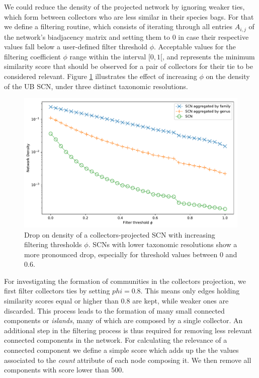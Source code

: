 We could reduce the density of the projected network by ignoring weaker ties, which form between collectors who are less similar in their species bags.
For that we define a filtering routine, which consists of iterating through all entries $A_{i,j}$ of the network's biadjacency matrix and setting them to $0$ in case their respective values fall below a user-defined filter threshold $\phi$.
Acceptable values for the filtering coefficient $\phi$ range within the interval $[0,1[$, and represents the minimum similarity score that should be observed for a pair of collectors for their tie to be considered relevant.
Figure \ref{fig:ub_scn_projCol_filter_thresh} illustrates the effect of increasing $\phi$ on the density of the UB SCN, under three distinct taxonomic resolutions. 

\begin{figure}[!ht]
  	\centering
    \includegraphics[width=0.9\linewidth]{figures/casestudy_ub/scn_projCol_filter_thresh.pdf}
    \caption{ Drop on density of a collectors-projected SCN with increasing filtering thresholds $\phi$. SCNs with lower taxonomic resolutions show a more pronounced drop, especially for threshold values between $0$ and $0.6$. }
    \label{fig:ub_scn_projCol_filter_thresh}
\end{figure}

For investigating the formation of communities in the collectors projection, we first filter collectors ties by setting $phi = 0.8$.
This means only edges holding similarity scores equal or higher than $0.8$ are kept, while weaker ones are discarded.
This process leads to the formation of many small connected components or \textit{islands}, many of which are composed by a single collector.
An additional step in the filtering process is thus required for removing less relevant connected components in the network.
For calculating the relevance of a connected component we define a simple score which adds up the the values associated to the \textit{count} attribute of each node composing it.
We then remove all components with score lower than $500$.

